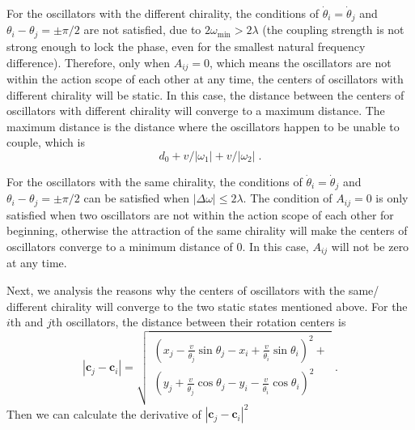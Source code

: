 \documentclass[%
 aip,
 amsmath,amssymb,
 reprint,%
]{revtex4-1}
\begin{document}
For the oscillators with the different chirality, the conditions of $\dot{\theta}_i=\dot{\theta}_j$ and $\theta _i-\theta _j=\pm\pi/2$ are not satisfied, due to $2\omega _{\min}>2\lambda $ (the coupling strength is not strong enough to lock the phase, even for the smallest natural frequency difference). Therefore, only when $A_{ij}=0$, which means the oscillators are not within the action scope of each other at any time, the centers of oscillators with different chirality will be static. In this case, the distance between the centers of oscillators with different chirality will converge to a maximum distance. The maximum distance is the distance where the oscillators happen to be unable to couple, which is
\begin{equation}\label{eq:maxDistance}
    d_0+v/\left| \omega _1 \right|+v/\left| \omega _2 \right|\;.
\end{equation} 

For the oscillators with the same chirality, the conditions of $\dot{\theta}_i=\dot{\theta}_j$ and $\theta _i-\theta _j=\pm\pi/2$ can be satisfied when $\left| \Delta \omega \right|\leqslant 2\lambda$. The condition of $A_{ij}=0$ is only satisfied when two oscillators are not within the action scope of each other for beginning, otherwise the attraction of the same chirality will make the centers of oscillators converge to a minimum distance of $0$. In this case, $A_{ij}$ will not be zero at any time. 

Next, we analysis the reasons why the centers of oscillators with the same/ different chirality will converge to the two static states mentioned above.
For the $i$th and $j$th oscillators, the distance between their rotation centers is
\begin{equation}\label{eq:distanceCenter}
    \left| \mathbf{c}_j-\mathbf{c}_i \right|=\sqrt{\begin{array}{l}
        \left( x_j-\frac{v}{\dot{\theta}_j}\sin \theta _j-x_i+\frac{v}{\dot{\theta}_i}\sin \theta _i \right) ^2+\\
        \left( y_j+\frac{v}{\dot{\theta}_j}\cos \theta _j-y_i-\frac{v}{\dot{\theta}_i}\cos \theta _i \right) ^2\\
    \end{array}}\;.
\end{equation}
Then we can calculate the derivative of $\left| \mathbf{c}_j-\mathbf{c}_i \right|^2$
\end{document}
